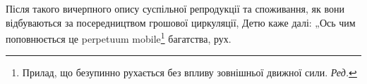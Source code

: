 Після такого вичерпного опису суспільної репродукції та споживання, як вони відбуваються за
посередництвом грошової циркуляції, Детю каже далі: „Ось чим поповнюється це perpetuum mobile\footnote*{Прилад, що безупинно рухається без впливу зовнішньої движної сили. \emph{Ред.}}
багатства, рух.
\parbreak{}  %
